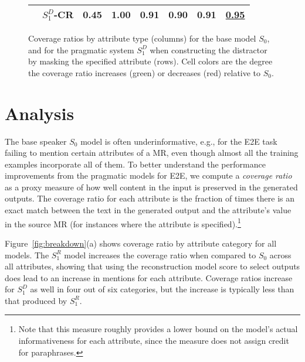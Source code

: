 \documentclass[11pt,a4paper]{article}
\newcommand{\pragd}[0]{$S_1^D$\xspace}
\newcommand{\pragr}[0]{$S_1^R$\xspace}
\newcommand{\eg}{e.g., }
\def\rot#1{\rotatebox{90}{#1}}
\begin{document}
\begin{figure*}[t]
\begin{subfigure}[b]{0.49\textwidth}
{\begin{tabular}{p{1mm}l|cccccc}
 \rot{\rlap{Distractor Attr.}} & \pragd-CR & 0.45\cellcolor{snsred!37} & 1.00\cellcolor{snsgreen!44} & 0.91\cellcolor{snsgreen!12} & 0.90\cellcolor{snsred!4} & 0.91\cellcolor{snsred!50} & \underline{0.95}\cellcolor{snsgreen!45} \\
\bottomrule
\end{tabular}
}
\caption{
Coverage ratios by attribute type (columns) for the base model $S_0$, and for the pragmatic system $S_1^D$ when constructing the distractor by masking the specified attribute (rows). Cell colors are the degree the coverage ratio increases (green) or decreases (red) relative to $S_0$. \vspace{-.5em}
}
\end{subfigure}
\caption{Coverage ratios for the E2E task by attribute type, estimating how frequently the values for each attribute from the input meaning representations are mentioned in the output text. 
}
\vspace{-1em}
\label{fig:breakdown}
\end{figure*}

\section{Analysis}
The base speaker $S_0$ model is often underinformative, \eg for the E2E task failing to mention certain attributes of a MR, even though almost all the training examples incorporate all of them.
To better understand the performance improvements from the pragmatic models for E2E, we 
compute a \emph{coverage ratio} as a proxy measure of how well content in the input is preserved in the generated outputs.
The coverage ratio for each attribute is the fraction of times there is an exact match between the text in the generated output and the attribute's value in the source MR (for instances where the attribute is specified).\footnote{Note that this measure roughly provides a lower bound on the model's actual informativeness for each attribute, since the measure does not assign credit for paraphrases. 
}



Figure~\ref{fig:breakdown}(a) shows coverage ratio by attribute category for all models. The \pragr model increases the coverage ratio when compared to $S_0$ across all attributes, showing that using the reconstruction model score to select outputs does lead to an increase in mentions for each attribute. Coverage ratios increase for \pragd as well in four out of six categories, but the increase is typically less than that produced by \pragr. 
\end{document}

